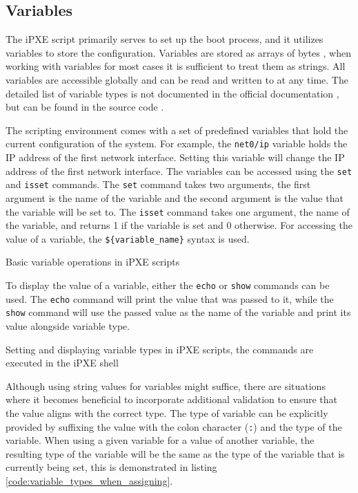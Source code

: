 \documentclass[../main.tex]{subfiles}
\begin{document}
\subsection{Variables}

The iPXE script primarily serves to set up the boot process, and it utilizes variables to store the configuration.
Variables are stored as arrays of bytes \cite{ipxe_settings_types_docs}, when working with variables for most cases it is sufficient to treat them as strings.
All variables are accessible globally and can be read and written to at any time.
The detailed list of variable types is not documented in the official documentation \cite{ipxe}, but can be found in the source code \cite{ipxe_settings_types}.


The scripting environment comes with a set of predefined variables that hold the current configuration of the system.
For example, the \texttt{net0/ip} variable holds the IP address of the first network interface. Setting
this variable will change the IP address of the first network interface.
The variables can be accessed using the \texttt{set} and \texttt{isset} commands.
The \texttt{set} command takes two arguments, the first argument is the name of the variable and the second argument is the value that the variable will be set to.
The \texttt{isset} command takes one argument, the name of the variable, and returns 1 if the variable is set and 0 otherwise.
For accessing the value of a variable, the \texttt{\$\{variable\_name\}} syntax is used.

\begin{listing}[H]
  \caption{Basic variable operations in iPXE scripts}
\end{listing}

To display the value of a variable, either the \texttt{echo} or \texttt{show} commands can be used.
The \texttt{echo} command will print the value that was passed to it, while the \texttt{show} command
will use the passed value as the name of the variable and print its value alongside variable type.

\begin{listing}[H]
  \caption{Setting and displaying variable types in iPXE scripts, the commands are executed in the iPXE shell}
\end{listing}


Although using string values for variables might suffice, there are situations where it becomes beneficial to incorporate additional validation to ensure that the value aligns with the correct type.
The type of variable can be explicitly provided by suffixing the value with the colon character (\texttt{:}) and the type of the variable.
When using a given variable for a value of another variable, the resulting type of the variable will be the same as the type of the variable that is currently being set, this
is demonstrated in listing \ref{code:variable_types_when_assigning}.
\end{document}
